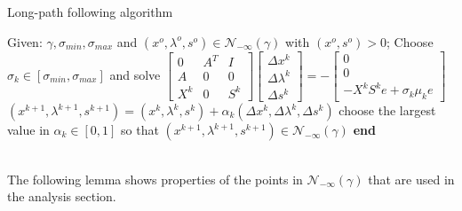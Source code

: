 \documentclass[a4paper,10 pt,titlepage,twoside]{book}
\theoremstyle{plain}
\theoremstyle{definition}
\theoremstyle{remark}
\begin{document}
\begin{algorithm}
	\caption{Long-path following algorithm}
	\begin{algorithmic}[1]		
		\State Given: $\gamma, \sigma_{min}, \sigma_{max}$ and $(x^{o}, \lambda^{o}, s^{o})\in\mathcal{N}_{-\infty}(\gamma)$ with $(x^{o}, s^{o})>0$;
		\State Choose $\sigma_{k}\in[\sigma_{min},\sigma_{max}]$ and solve
		\State $\begin{bmatrix}
			0&A^{T}&I \\A&0&0\\X^{k}&0&S^{k}
			\end{bmatrix}\begin{bmatrix}
			\Delta x^{k}\\\Delta\lambda^{k} \\\Delta s^{k}
			\end{bmatrix}=-\begin{bmatrix}
			0\\0\\-X^{k}S^{k}e + \sigma_{k}\mu_{k}e
			\end{bmatrix}$
		\State $(x^{k+1}, \lambda^{k+1}, s^{k+1}) = (x^{k}, \lambda^{k}, s^{k})+ \alpha_{k}(\Delta x^{k}, \Delta\lambda^{k}, \Delta s^{k})$
		\State choose the largest value in $\alpha_{k}\in[0,1]$ so that $(x^{k+1}, \lambda^{k+1}, s^{k+1})\in\mathcal{N}_{-\infty}(\gamma)$	
\textbf{end}
	\end{algorithmic}
\end{algorithm}\\
The following lemma shows properties of the points in $\mathcal{N}_{-\infty}(\gamma)$ that are used in the analysis section.
\end{document}
